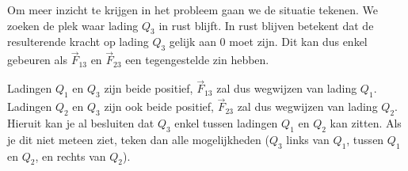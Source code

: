 \documentclass{ximera}
\begin{document}
\begin{example}[foldable=true,title={Voorbeeld: drie ladingen op één lijn of lading in evenwicht}]
\begin{solution}
        Om meer inzicht te krijgen in het probleem gaan we de situatie tekenen. We zoeken de plek waar lading $Q_{3}$ in rust blijft. In rust blijven betekent dat de resulterende kracht op lading $Q_{3}$ gelijk aan 0 moet zijn. Dit kan dus enkel gebeuren als $\vec{F}_{13}$ en $\vec{F}_{23}$ een tegengestelde zin hebben. 
        
        Ladingen $Q_{1}$ en $Q_{3}$ zijn beide positief, $\vec{F}_{13}$ zal dus wegwijzen van lading $Q_1$. Ladingen $Q_{2}$ en $Q_{3}$ zijn ook beide positief, $\vec{F}_{23}$ zal dus wegwijzen van lading $Q_{2}$. Hieruit kan je al besluiten dat $Q_{3}$ enkel tussen ladingen $Q_{1}$ en $Q_{2}$ kan zitten. Als je dit niet meteen ziet, teken dan alle mogelijkheden ($Q_{3}$ links van $Q_{1}$, tussen $Q_{1}$ en $Q_{2}$, en rechts van $Q_{2}$).
        
        \begin{center}
        \end{center}
        

\end{solution}
\end{example}
\end{document}
